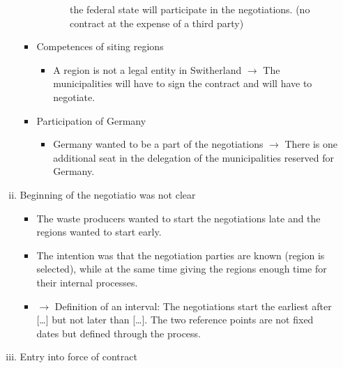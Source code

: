 \begin{itemize}
\begin{enumerate}[i.]
\begin{itemize}
\begin{itemize}
\begin{itemize}
                                        the federal state will participate in the negotiations.
                                        (no contract at the expense of a third party)
                                \end{itemize}
                        \end{itemize}
                    \item Competences of siting regions
                        \begin{itemize}
                            \item A region is not a legal entity in Switherland
                                $\rightarrow$ The municipalities will have to sign
                                the contract and will have to negotiate.
                        \end{itemize}
                    \item Participation of Germany
                        \begin{itemize}
                            \item Germany wanted to be a part of the negotiations
                                $\rightarrow$ There is one additional seat in the
                                delegation of the municipalities reserved for Germany.
                        \end{itemize}
                \end{itemize}
            \item Beginning of the negotiatio was not clear
                \begin{itemize}
                    \item The waste producers wanted to start the negotiations late
                        and the regions wanted to start early.
                    \item The intention was that the negotiation parties are known
                        (region is selected), while at the same time giving the regions
                        enough time for their internal processes.
                    \item $\rightarrow$ Definition of an interval: The negotiations start
                        the earliest after [\dots] but not later than [\dots]. The two
                        reference points are not fixed dates but defined through the
                        process.
                \end{itemize}
            \item Entry into force of contract

\end{enumerate}
\end{itemize}
